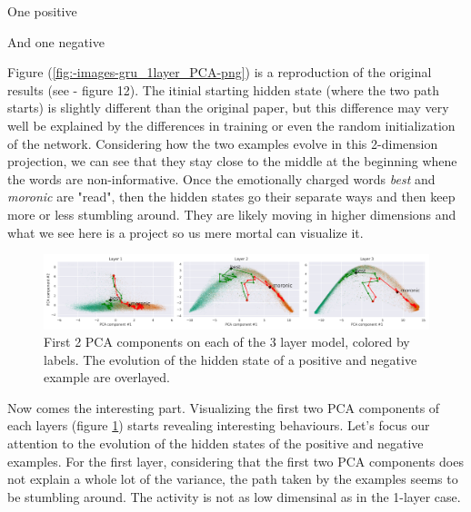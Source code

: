 \documentclass{article}
\begin{document}
One positive

And one negative

Figure (\ref{fig:-images-gru_1layer_PCA-png}) is a reproduction of the original results (see \cite{maheswaranathan2019reverse} - figure 12). The itinial starting hidden state (where the two path starts) is slightly different than the original paper, but this difference may very well be explained by the differences in training or even the random initialization of the network. Considering how the two examples evolve in this 2-dimension projection, we can see that they stay close to the middle at the beginning whene the words are non-informative. Once the emotionally charged words \textit{best} and \textit{moronic} are "read", then the hidden states go their separate ways and then keep more or less stumbling around. They are likely moving in higher dimensions and what we see here is a project so us mere mortal can visualize it. 

\begin{figure}[H]
  \centering
  \includegraphics[width=1\textwidth]{../images/gru_3layer_PCA.png}
  \caption{
    First 2 PCA components on each of the 3 layer model, colored by labels. 
    The evolution of the hidden state of a positive and negative example are overlayed.
  }
  \label{fig:-images-gru_3layer_PCA-png}
\end{figure}  

Now comes the interesting part. Visualizing the first two PCA components of each layers (figure \ref{fig:-images-gru_3layer_PCA-png}) starts revealing interesting behaviours. Let's focus our attention to the evolution of the hidden states of the positive and negative examples. For the first layer, considering that the first two PCA components does not explain a whole lot of the variance, the path taken by the examples seems to be stumbling around. The activity is not as low dimensinal as in the 1-layer case.
\end{document}
